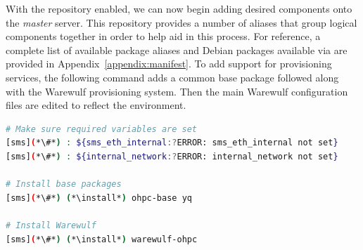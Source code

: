 With the \OHPC{} repository enabled, we can now begin adding desired components onto the
{\em master} server. This repository provides a number of aliases that group
logical components together in order to help aid in this process. For
reference, a complete list of available package aliases and Debian packages available
via \OHPC{} are provided in Appendix~\ref{appendix:manifest}. To add
support for provisioning services, the following command adds a common base
package followed along with the Warewulf provisioning system. Then the main
Warewulf configuration files are edited to reflect the environment.

\begin{lstlisting}[language=bash,keywords={}]
# Make sure required variables are set
[sms](*\#*) : ${sms_eth_internal:?ERROR: sms_eth_internal not set}
[sms](*\#*) : ${internal_network:?ERROR: internal_network not set}

# Install base packages
[sms](*\#*) (*\install*) ohpc-base yq

# Install Warewulf
[sms](*\#*) (*\install*) warewulf-ohpc

\end{lstlisting}
